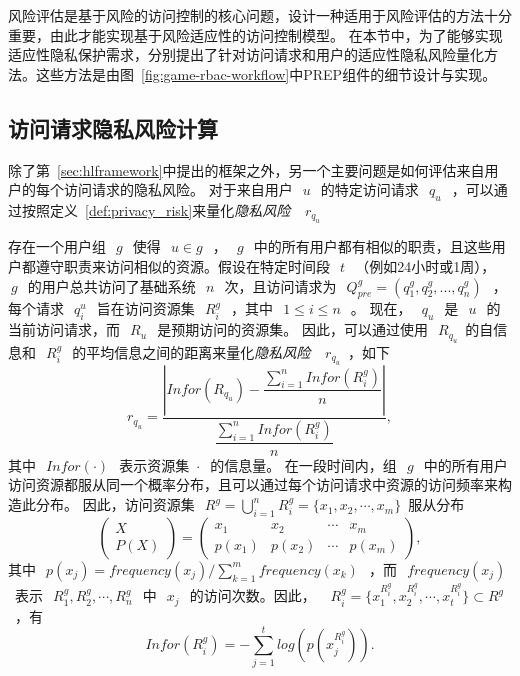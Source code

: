 风险评估是基于风险的访问控制的核心问题，设计一种适用于风险评估的方法十分重要，由此才能实现基于风险适应性的访问控制模型。 在本节中，为了能够实现适应性隐私保护需求，分别提出了针对访问请求和用户的适应性隐私风险量化方法。这些方法是由图~\ref{fig:game-rbac-workflow}中PREP组件的细节设计与实现。

\subsection{访问请求隐私风险计算}

除了第~\ref{sec:hlframework}中提出的框架之外，另一个主要问题是如何评估来自用户的每个访问请求的隐私风险。 对于来自用户~$~u~$~的特定访问请求~$~q_u~$~，可以通过按照定义~\ref{def:privacy_risk}来量化\emph{隐私风险} ~$~r_{q_u}$~

存在一个用户组~$~g~$~使得~$~u \in g~$~，~$~g~$~中的所有用户都有相似的职责，且这些用户都遵守职责来访问相似的资源。假设在特定时间段~$~t~$~（例如24小时或1周），~$~g~$~的用户总共访问了基础系统~$~n~$~次，且访问请求为~$~Q^g_{pre}=(q^g_1,q^g_2,...,q^g_n)~$~，每个请求~$~q^u_i~$~旨在访问资源集~$~R^g_i~$~，其中~$~1 \leq i \leq n~$~。
现在，~$~q_u~$~是~$~u~$~的当前访问请求，而~$~R_u~$~是预期访问的资源集。 因此，可以通过使用~$~R_{q_u}$~的自信息和~$~R^g_i~$~的平均信息之间的距离来量化\emph{隐私风险} ~$~r_{q_u}$~，如下
\begin{equation}\label{eq:privacy_risk_qu}
r_{q_u} = \dfrac{|Infor(R_{q_u})-\dfrac{\sum ^{n}_{i=1} Infor(R^g_i)}{n}|}{\dfrac{\sum ^{n}_{i=1} Infor(R^g_i)}{n}}, 
\end{equation}
其中~$~Infor(\cdot)~$~表示资源集~$\cdot~$~的信息量。 在一段时间内，组~$~g~$~中的所有用户访问资源都服从同一个概率分布，且可以通过每个访问请求中资源的访问频率来构造此分布。 因此，访问资源集~$~R^g = \bigcup _{i=1}^n R^g_i=\{x_1, x_2, \cdots, x_m\}$~服从分布
\begin{equation}\label{eq:distribution_Rg}
\left(
\begin{array}{c}
X \\ P(X)
\end{array}
\right)
=\left(
\begin{array}{cccccccccc}
x_1 &  x_2 & \cdots & x_m
\\ p(x_1) &  p(x_2) & \cdots & p(x_m)
\end{array}
\right),
\end{equation}
其中~$~p(x_j)=frequency(x_j)/\sum_{k=1}^m frequency(x_k)~$~，而~$~frequency(x_j)~$~表示~$~R^g_1, R^g_2, \cdots, R^g_n~$~中~$~x_j~$~的访问次数。因此， ~$~R^g_i =\{x_1^{R^g_i},x_2^{R^g_i},\cdots, x_t^{R^g_i}\} \subset R^g~$~，有
\begin{equation}\label{eq:information_Rgi}
Infor(R^g_i)=-\sum_{j=1}^t log(p(x_j^{R^g_i})).
\end{equation}

